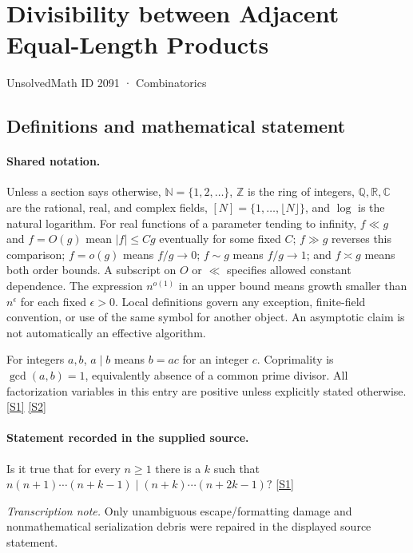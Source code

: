 \documentclass[11pt,a4paper]{article}
\newcommand{\N}{\mathbb{N}}
\newcommand{\Z}{\mathbb{Z}}
\newcommand{\Q}{\mathbb{Q}}
\newcommand{\R}{\mathbb{R}}
\newcommand{\C}{\mathbb{C}}
\newcommand{\sref}[2]{\hyperlink{source:#1:#2}{[S#2]}}
\begin{document}

\setcounter{section}{2090}

\section{Divisibility between Adjacent Equal-Length Products}\label{2091}

{\small\sffamily UnsolvedMath ID 2091 · Combinatorics}

\subsection{Definitions and mathematical statement}

\paragraph{Shared notation.}Unless a section says otherwise, $\N=\{1,2,\ldots\}$,
$\Z$ is the ring of integers, $\Q,\R,\C$ are the rational, real, and complex
fields, $[N]=\{1,\ldots,\lfloor N\rfloor\}$, and $\log$ is the natural
logarithm. For real functions of a parameter tending to infinity,
$f\ll g$ and $f=O(g)$ mean $|f|\leq Cg$ eventually for some fixed $C$;
$f\gg g$ reverses this comparison; $f=o(g)$ means $f/g\to0$;
$f\sim g$ means $f/g\to1$; and $f\asymp g$ means both order bounds.
A subscript on $O$ or $\ll$ specifies allowed constant dependence.
The expression $n^{o(1)}$ in an upper bound means growth smaller than
$n^\epsilon$ for each fixed $\epsilon>0$. Local definitions govern any
exception, finite-field convention, or use of the same symbol for another
object. An asymptotic claim is not automatically an effective algorithm.



For integers $a,b$, $a\mid b$ means $b=ac$ for an integer $c$. Coprimality is $\gcd(a,b)=1$, equivalently absence of a common prime divisor. All factorization variables in this entry are positive unless explicitly stated otherwise. \sref{2091}{1} \sref{2091}{2}

\paragraph{Statement recorded in the supplied source.}
Is it true that for every $n\geq 1$ there is a $k$ such that $ n(n+1)\cdots(n+k-1)\mid (n+k)\cdots (n+2k-1)? $ \sref{2091}{1}

{\small\emph{Transcription note.} Only unambiguous escape/formatting damage and nonmathematical serialization debris were repaired in the displayed source statement.}
\end{document}
